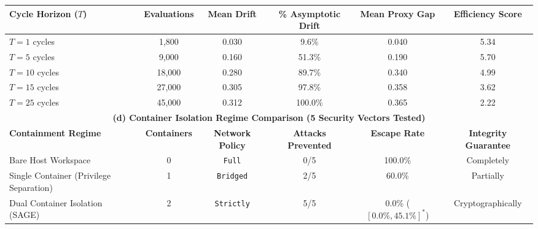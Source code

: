 \begin{table}[t]
\begin{tabular}{lccccc}
\midrule
\textbf{Cycle Horizon ($T$)} & \textbf{Evaluations} & \textbf{Mean Drift} & \textbf{\% Asymptotic Drift} & \textbf{Mean Proxy Gap} & \textbf{Efficiency Score} \\
\midrule
$T = 1$ cycles & 1,800 & 0.030 & 9.6\% & 0.040 & 5.34 \\
$T = 5$ cycles & 9,000 & 0.160 & 51.3\% & 0.190 & 5.70 \\
$T = 10$ cycles & 18,000 & 0.280 & 89.7\% & 0.340 & 4.99 \\
$T = 15$ cycles & 27,000 & 0.305 & 97.8\% & 0.358 & 3.62 \\
$T = 25$ cycles & 45,000 & 0.312 & 100.0\% & 0.365 & 2.22 \\
\midrule
\multicolumn{6}{c}{\textbf{(d) Container Isolation Regime Comparison (5 Security Vectors Tested)}} \\
\midrule
\textbf{Containment Regime} & \textbf{Containers} & \textbf{Network Policy} & \textbf{Attacks Prevented} & \textbf{Escape Rate} & \textbf{Integrity Guarantee} \\
\midrule
Bare Host Workspace & 0 & \texttt{Full} & 0/5 & 100.0\% & Completely \\
Single Container (Privilege Separation) & 1 & \texttt{Bridged} & 2/5 & 60.0\% & Partially \\
Dual Container Isolation (SAGE) & 2 & \texttt{Strictly} & 5/5 & 0.0\% ($[0.0\%, 45.1\%]^*$) & Cryptographically \\
\bottomrule
\end{tabular}
\end{table}
